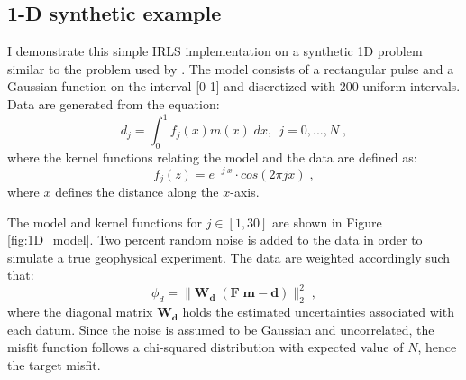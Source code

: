 \subsection{1-D synthetic example}
I demonstrate this simple IRLS implementation on a synthetic 1D problem similar to the problem used by \cite{LiOldenburg1996}.
The model consists of a rectangular pulse and a Gaussian function on the interval [0 1] and discretized with 200 uniform intervals. Data are generated from the equation:
\begin{equation} \label{eq:9}
  d_j = \int_0^1 f_j(x) m(x) \; dx, \:\: j = 0, ..., N\;,
\end{equation}
where the kernel functions relating the model and the data are defined as:
\begin{equation} \label{eq:kernel_1D}
  f_j(z) = e^{-j\:x }\cdot cos(2 \pi j x) \;,
\end{equation}
where $x$ defines the distance along the $x$-axis. 

The model and kernel functions for $j \in [1 , 30]$ are shown in Figure \ref{fig:1D_model}. 
Two percent random noise is added to the data in order to simulate a true geophysical experiment. 
The data are weighted accordingly such that:
\begin{equation} \label{eq:Weighted_misifit}
	\phi_d = \|\mathbf{W_d \;( F\;m - d)}\|_2^{2}\;,
\end{equation}
where the diagonal matrix $\mathbf{W_d}$ holds the estimated uncertainties associated with each datum. 
Since the noise is assumed to be Gaussian and uncorrelated, the misfit function follows a chi-squared distribution with expected value of $N$, hence the target misfit.

